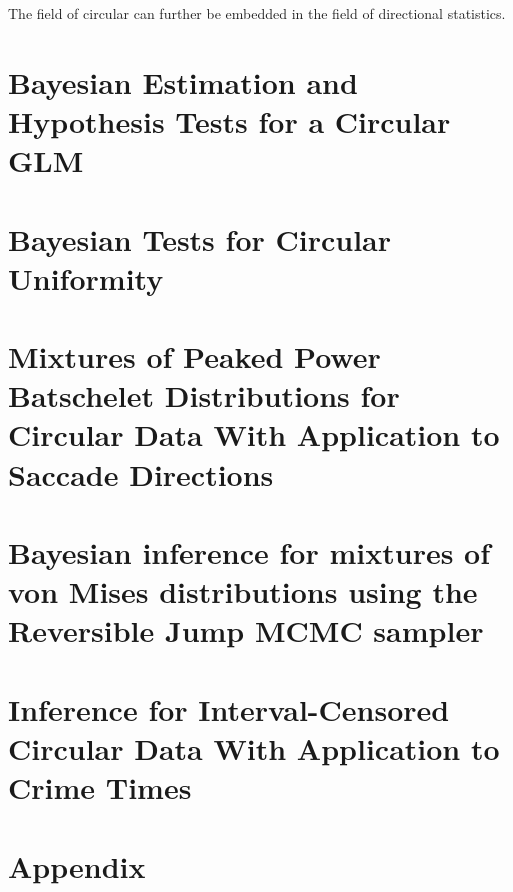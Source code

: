 \documentclass[12pt, a4paper]{book}\usepackage[]{graphicx}\usepackage[]{color}
\begin{document}
The field of circular can further be embedded in the field of directional statistics.


\chapter{Bayesian Estimation and Hypothesis Tests for a Circular GLM}
\label{circglm}



\chapter{Bayesian Tests for Circular Uniformity}
\label{hypotest}



\chapter{Mixtures of Peaked Power Batschelet Distributions for Circular Data  With Application to Saccade Directions}
\label{flexcmix}

%
%
\chapter{Bayesian inference for mixtures of von Mises distributions using the Reversible Jump MCMC sampler}
\label{revrjump}

%
\chapter{Inference for Interval-Censored Circular Data With Application to Crime Times}
\label{dpm_crim}



% 





\chapter{Appendix}

\appendix






\backmatter



\end{document}
